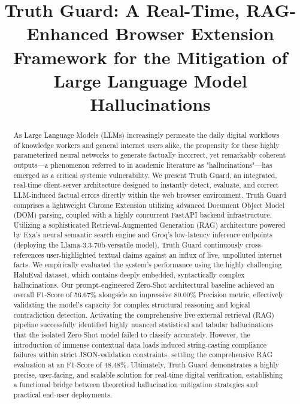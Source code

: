 \documentclass[conference]{IEEEtran}
\begin{document}
\title{Truth Guard: A Real-Time, RAG-Enhanced Browser Extension Framework for the Mitigation of Large Language Model Hallucinations\\
}

\author{
}

\maketitle

\begin{abstract}
As Large Language Models (LLMs) increasingly permeate the daily digital workflows of knowledge workers and general internet users alike, the propensity for these highly parameterized neural networks to generate factually incorrect, yet remarkably coherent outputs—a phenomenon referred to in academic literature as "hallucinations"—has emerged as a critical systemic vulnerability. We present Truth Guard, an integrated, real-time client-server architecture designed to instantly detect, evaluate, and correct LLM-induced factual errors directly within the web browser environment. Truth Guard comprises a lightweight Chrome Extension utilizing advanced Document Object Model (DOM) parsing, coupled with a highly concurrent FastAPI backend infrastructure. Utilizing a sophisticated Retrieval-Augmented Generation (RAG) architecture powered by Exa's neural semantic search engine and Groq's low-latency inference endpoints (deploying the Llama-3.3-70b-versatile model), Truth Guard continuously cross-references user-highlighted textual claims against an influx of live, unpolluted internet facts. We empirically evaluated the system's performance using the highly challenging HaluEval dataset, which contains deeply embedded, syntactically complex hallucinations. Our prompt-engineered Zero-Shot architectural baseline achieved an overall F1-Score of 56.67\% alongside an impressive 80.00\% Precision metric, effectively validating the model's capacity for complex structural reasoning and logical contradiction detection. Activating the comprehensive live external retrieval (RAG) pipeline successfully identified highly nuanced statistical and tabular hallucinations that the isolated Zero-Shot model failed to classify accurately. However, the introduction of immense contextual data loads induced string-casting compliance failures within strict JSON-validation constraints, settling the comprehensive RAG evaluation at an F1-Score of 48.48\%. Ultimately, Truth Guard demonstrates a highly precise, user-facing, and scalable solution for real-time digital verification, establishing a functional bridge between theoretical hallucination mitigation strategies and practical end-user deployments.
\end{abstract}
\end{document}
